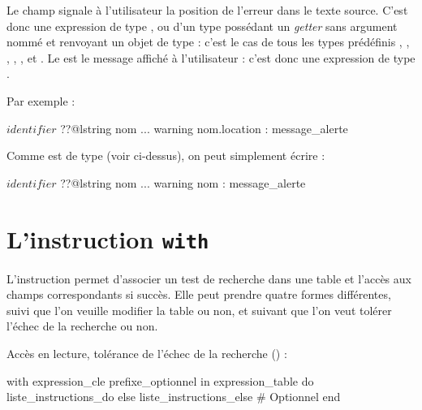 {{{Le champ  signale à l'utilisateur la position de l'erreur dans le texte source. C'est donc une expression de type , ou d'un type possédant un \emph{getter} sans argument nommé  et renvoyant un objet de type  : c'est le cas de tous les types prédéfinis , , , , ,  et . Le  est le message affiché à l'utilisateur : c'est donc une expression de type .

Par exemple :

\begin{galgascode}
$identifier$ ??@lstring nom
...
warning nom.location : message_alerte
\end{galgascode}

Comme  est de type  (voir ci-dessus), on peut simplement écrire :
\begin{galgascode}
$identifier$ ??@lstring nom
...
warning nom : message_alerte
\end{galgascode}










\section{L'instruction \texttt{with}}

L'instruction  permet d'associer un test de recherche dans une table et l'accès aux champs correspondants si succès. Elle peut prendre quatre formes différentes, suivi que l'on veuille modifier la table ou non, et suivant que l'on veut tolérer l'échec de la recherche ou non.


Accès en lecture, tolérance de l'échec de la recherche () :
\begin{galgascode}
with expression_cle prefixe_optionnel in expression_table
do liste_instructions_do
else liste_instructions_else # Optionnel
end
\end{galgascode}

}}}
